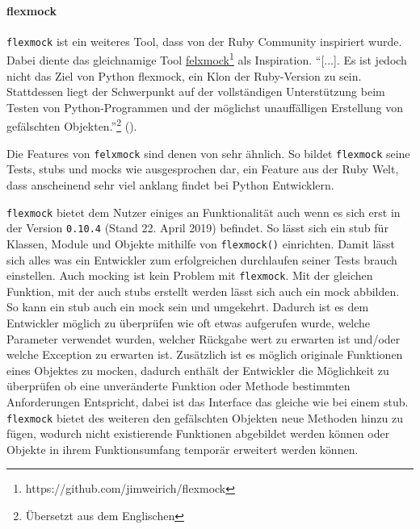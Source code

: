 \paragraph{flexmock}\label{python-tools:flexmock}\mbox{}
\newline
\lstinline{flexmock} ist ein weiteres Tool, dass von der Ruby Community inspiriert wurde.
Dabei diente das gleichnamige Tool
\href{https://github.com/jimweirich/flexmock}{felxmock}\footnote{https://github.com/jimweirich/flexmock}
als Inspiration.
"`[...]. Es ist jedoch nicht das Ziel von Python flexmock, ein Klon der
Ruby-Version zu sein. Stattdessen liegt der Schwerpunkt auf der vollständigen Unterstützung
beim Testen von Python-Programmen und der möglichst unauffälligen Erstellung von gefälschten
Objekten."'\footnote{Übersetzt aus dem Englischen} (\cite{felxmock:docs:0.10.3}).

Die Features von \lstinline{felxmock} sind denen von  sehr ähnlich.
So bildet \lstinline{flexmock} seine Tests, \glspl{stub} und \glspl{mock} wie ausgesprochen dar,
ein Feature aus der Ruby Welt, dass anscheinend sehr viel anklang findet bei Python Entwicklern.

\lstinline{flexmock} bietet dem Nutzer einiges an Funktionalität auch wenn es sich erst in der
Version \lstinline{0.10.4} (Stand 22. April 2019) befindet. So lässt sich ein \Gls{stub} für
Klassen, Module und Objekte mithilfe von \lstinline{flexmock()} einrichten. Damit lässt sich
alles was ein Entwickler zum erfolgreichen durchlaufen seiner Tests brauch einstellen. Auch
\gls{mock}ing ist kein Problem mit \lstinline{flexmock}. Mit der gleichen Funktion, mit der
auch \Glspl{stub} erstellt werden lässt sich auch ein \Gls{mock} abbilden. So kann ein
\Gls{stub} auch ein \Gls{mock} sein und umgekehrt.
Dadurch ist es dem Entwickler möglich zu überprüfen wie oft etwas aufgerufen wurde, welche
Parameter verwendet wurden, welcher Rückgabe wert zu erwarten ist und/oder welche Exception
zu erwarten ist.
Zusätzlich ist es möglich originale Funktionen eines Objektes zu \gls{mock}en, dadurch
enthält der Entwickler die Möglichkeit zu überprüfen ob eine unveränderte Funktion oder
Methode bestimmten Anforderungen Entspricht, dabei ist das Interface das gleiche wie bei
einem \Gls{stub}.
\lstinline{flexmock} bietet des weiteren den gefälschten Objekten neue Methoden hinzu zu fügen,
wodurch nicht existierende Funktionen abgebildet werden können oder Objekte in ihrem
Funktionsumfang temporär erweitert werden können.

